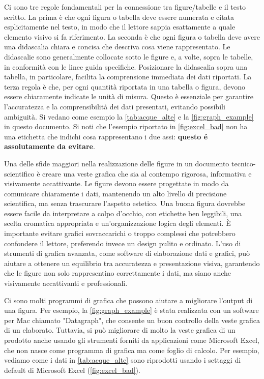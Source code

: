 \documentclass[9pt,a4paper,twoside]{rho-class/rho}
\begin{document}
Ci sono tre regole fondamentali per la connessione tra figure/tabelle e il testo scritto. La prima è che ogni figura o tabella deve essere numerata e citata esplicitamente nel testo, in modo che il lettore sappia esattamente a quale elemento visivo si fa riferimento. La seconda è che ogni figura o tabella deve avere una didascalia chiara e concisa che descriva cosa viene rappresentato. Le didascalie sono generalmente collocate sotto le figure e, a volte, sopra le tabelle, in conformità con le linee guida specifiche. Posizionare la didascalia sopra una tabella, in particolare, facilita la comprensione immediata dei dati riportati.  La terza regola è che, per ogni quantità riportata in una tabella o figura, devono essere chiaramente indicate le unità di misura. Questo è essenziale per garantire l’accuratezza e la comprensibilità dei dati presentati, evitando possibili ambiguità. Si vedano come esempio la \autoref{tab:acque_alte} e la \autoref{fig:graph_example} in questo documento. Si noti che l'esempio riportato in \autoref{fig:excel_bad} non ha una etichetta che indichi cosa rappresentano i due assi: \textbf{questo é assolutamente da evitare}.

Una delle sfide maggiori nella realizzazione delle figure in un documento tecnico-scientifico è creare una veste grafica che sia al contempo rigorosa, informativa e visivamente accattivante. Le figure devono essere progettate in modo da comunicare chiaramente i dati, mantenendo un alto livello di precisione scientifica, ma senza trascurare l’aspetto estetico. Una buona figura dovrebbe essere facile da interpretare a colpo d’occhio, con etichette ben leggibili, una scelta cromatica appropriata e un’organizzazione logica degli elementi. È importante evitare grafici sovraccarichi o troppo complessi che potrebbero confondere il lettore, preferendo invece un design pulito e ordinato. L’uso di strumenti di grafica avanzata, come software di elaborazione dati e grafici, può aiutare a ottenere un equilibrio tra accuratezza e presentazione visiva, garantendo che le figure non solo rappresentino correttamente i dati, ma siano anche visivamente accattivanti e professionali. 

Ci sono molti programmi di grafica che possono aiutare a migliorare l'output di una figura. Per esempio, la \autoref{fig:graph_example} è stata realizzata con un software per Mac chiamato "Datagraph", che consente un buon controllo della veste grafica di un elaborato. Tuttavia, si può migliorare di molto la veste grafica di un prodotto anche usando gli strumenti forniti da applicazioni come Microsoft Excel, che non nasce come programma di grafica ma come foglio di calcolo. Per esempio, vediamo come i dati in \autoref{tab:acque_alte} sono riprodotti usando i settaggi di default di Microsoft Excel (\autoref{fig:excel_bad}).
\end{document}
